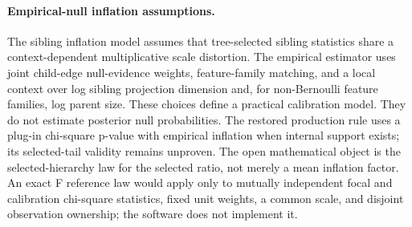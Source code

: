\paragraph{Empirical-null inflation assumptions.}
The sibling inflation model assumes that tree-selected sibling statistics
share a context-dependent multiplicative scale distortion. The empirical estimator uses
joint child-edge null-evidence weights, feature-family matching, and a local
context over log sibling projection dimension and, for non-Bernoulli feature
families, log parent size. These choices define a practical calibration model.
They do not estimate posterior null probabilities. The restored production
rule uses a plug-in chi-square p-value with empirical inflation when internal
support exists; its selected-tail validity remains unproven. The open mathematical object is the selected-hierarchy law for the
selected ratio, not merely a mean inflation factor. An exact F reference law
would apply only to mutually independent focal and calibration chi-square
statistics, fixed unit weights, a common scale, and disjoint observation
ownership; the software does not implement it.

